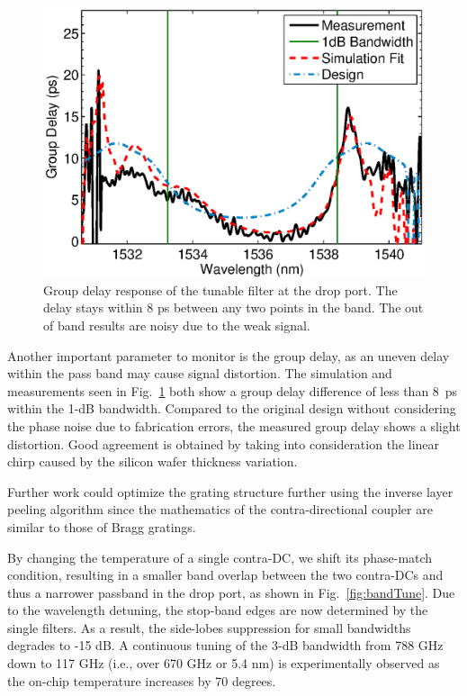 \documentclass[9pt,twocolumn,twoside]{osajnl}
\begin{document}
\begin{figure}[tbp]
\centering
\includegraphics[width=.99\columnwidth]{data/Phase3}
\caption{ Group delay response of the tunable filter at the drop port. The delay stays within 8 ps between any two points in the band. The out of band results are noisy due to the weak signal.}
\label{fig:phase}
\end{figure}
Another important parameter to monitor is the group delay, as an uneven delay within the pass band may cause signal distortion. The simulation and measurements seen in Fig.~\ref{fig:phase} both show a group delay difference of less than 8~ps within the 1-dB bandwidth. 
Compared to the original design without considering the phase noise due to fabrication errors, the measured group delay shows a slight distortion. Good agreement is obtained by taking into consideration the linear chirp caused by the silicon wafer thickness variation.

Further work could optimize the grating structure further using the inverse layer peeling algorithm\cite{skaar2001synthesis} since the mathematics of the contra-directional coupler are similar to those of Bragg gratings.

By changing the temperature of a single contra-DC, we shift its phase-match condition, resulting in a smaller band overlap between the two contra-DCs and thus a narrower passband in the drop port, as shown in Fig.~\ref{fig:bandTune}.  
Due to the wavelength detuning,  the stop-band edges are now determined by the single filters. 
As a result, the side-lobes suppression for small bandwidths degrades to -15 dB.
A continuous tuning of the 3-dB bandwidth from 788 GHz down to 117 GHz (i.e., over 670 GHz or 5.4 nm) is experimentally observed as the on-chip temperature increases by 70 degrees. 
\end{document}
